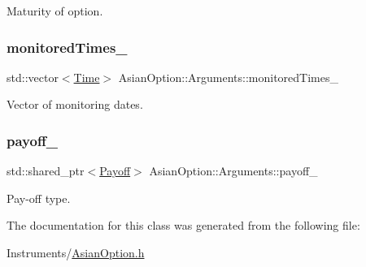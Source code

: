 Maturity of option. 

\hypertarget{class_asian_option_1_1_arguments_a27e013476613aec57076742ba561a722}{}\label{class_asian_option_1_1_arguments_a27e013476613aec57076742ba561a722} 
\subsubsection{\texorpdfstring{monitored\+Times\+\_\+}{monitoredTimes\_}}
{\footnotesize\ttfamily std\+::vector$<$\hyperlink{_name_def_8h_ac2d3e0ba793497bcca555c7c2cf64ff3}{Time}$>$ Asian\+Option\+::\+Arguments\+::monitored\+Times\+\_\+}



Vector of monitoring dates. 

\hypertarget{class_asian_option_1_1_arguments_ae44f022e21c05aa688d1d94a0f57d125}{}\label{class_asian_option_1_1_arguments_ae44f022e21c05aa688d1d94a0f57d125} 
\subsubsection{\texorpdfstring{payoff\+\_\+}{payoff\_}}
{\footnotesize\ttfamily std\+::shared\+\_\+ptr$<$\hyperlink{class_payoff}{Payoff}$>$ Asian\+Option\+::\+Arguments\+::payoff\+\_\+}



Pay-\/off type. 



The documentation for this class was generated from the following file\+:\begin{DoxyCompactItemize}
\item 
Instruments/\hyperlink{_asian_option_8h}{Asian\+Option.\+h}\end{DoxyCompactItemize}
